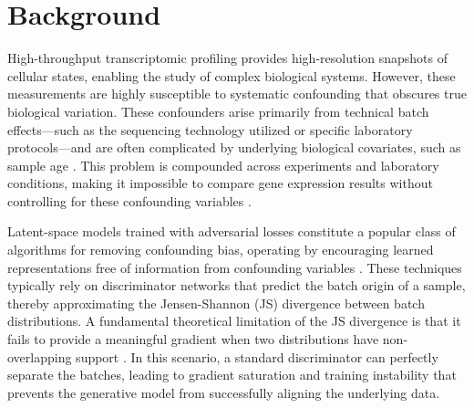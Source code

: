 \documentclass[unnumsec,webpdf,contemporary,large]{oup-authoring-template}%
\theoremstyle{thmstyleone}%
\theoremstyle{thmstyletwo}%
\theoremstyle{thmstylethree}%
\begin{document}





\maketitle

\section{Background}
High-throughput transcriptomic profiling provides high-resolution snapshots of cellular states, enabling the study of complex biological systems. However, these measurements are highly susceptible to systematic confounding that obscures true biological variation. These confounders arise primarily from technical batch effects---such as the sequencing technology utilized \citep{Tung2017-zb} or specific laboratory protocols---and are often complicated by underlying biological covariates, such as sample age \citep{Stegle2015-gr}. This problem is compounded across experiments and laboratory conditions, making it impossible to compare gene expression results without controlling for these confounding variables \citep{Leek2010-ho, Goh2022AreBE, Yu2024AssessingAM}.

Latent-space models trained with adversarial losses constitute a popular class of algorithms for removing confounding bias, operating by encouraging learned representations free of information from confounding variables \citep{10.1093/bioinformatics/btaa796, He2025-ip}. These techniques typically rely on discriminator networks that predict the batch origin of a sample, thereby approximating the Jensen-Shannon (JS) divergence between batch distributions. A fundamental theoretical limitation of the JS divergence is that it fails to provide a meaningful gradient when two distributions have non-overlapping support \citep{10.5555/3305381.3305404}. In this scenario, a standard discriminator can perfectly separate the batches, leading to gradient saturation and training instability that prevents the generative model from successfully aligning the underlying data.
\end{document}
